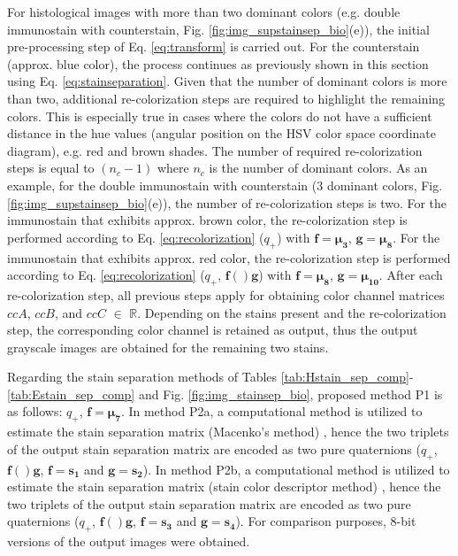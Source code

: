 \documentclass[superscriptaddress,longbibliography,aps,prl,twocolumn,10pt]{revtex4-2}
\begin{document}
For histological images with more than two dominant colors (e.g. double immunostain with counterstain, Fig. \ref{fig:img_supstainsep_bio}(e)), the initial pre-processing step of Eq. \ref{eq:transform} is carried out. For the counterstain (approx. blue color), the process continues as previously shown in this section using Eq. \ref{eq:stainseparation}. Given that the number of dominant colors is more than two, additional re-colorization steps are required to highlight the remaining colors. This is especially true in cases where the colors do not have a sufficient distance in the hue values (angular position on the HSV color space coordinate diagram), e.g. red and brown shades. The number of required re-colorization steps is equal to $(n_{c}-1)$ where $n_{c}$ is the number of dominant colors. As an example, for the double immunostain with counterstain (3 dominant colors, Fig. \ref{fig:img_supstainsep_bio}(e)), the number of re-colorization steps is two. For the immunostain that exhibits approx. brown color, the re-colorization step is performed according to Eq. \ref{eq:recolorization} ($q_+$) with $\boldsymbol{f} = \boldsymbol{\mu_{3}}$, $\boldsymbol{g} = \boldsymbol{\mu_{8}}$. For the immunostain that exhibits approx. red color, the re-colorization step is performed according to Eq. \ref{eq:recolorization} ($q_+$, $\boldsymbol{f}()\boldsymbol{g}$) with $\boldsymbol{f} = \boldsymbol{\mu_{8}}$, $\boldsymbol{g} = \boldsymbol{\mu_{10}}$. After each re-colorization step, all previous steps apply for obtaining color channel matrices $ccA$, $ccB$, and $ccC$ $\in$ $\mathbb{R}$. Depending on the stains present and the re-colorization step, the corresponding color channel is retained as output, thus the output grayscale images are obtained for the remaining two stains.

Regarding the stain separation methods of Tables \ref{tab:Hstain_sep_comp}-\ref{tab:Estain_sep_comp} and Fig. \ref{fig:img_stainsep_bio}, proposed method P1 is as follows: $q_+$, $\boldsymbol{f} = \boldsymbol{\mu_{7}}$. In method P2a, a computational method is utilized to estimate the stain separation matrix (Macenko's method) \cite{Macenko2009, stain_normalisation_toolbox_v2_2}, hence the two triplets of the output stain separation matrix are encoded as two pure quaternions ($q_+$, $\boldsymbol{f}()\boldsymbol{g}$, $\boldsymbol{f}=\boldsymbol{s_{1}}$ and $\boldsymbol{g}=\boldsymbol{s_{2}}$). In method P2b, a computational method is utilized to estimate the stain separation matrix (stain color descriptor method) \cite{Khan2014, stain_normalisation_toolbox_v2_2}, hence the two triplets of the output stain separation matrix are encoded as two pure quaternions ($q_+$, $\boldsymbol{f}()\boldsymbol{g}$, $\boldsymbol{f}=\boldsymbol{s_{3}}$ and $\boldsymbol{g}=\boldsymbol{s_{4}}$). For comparison purposes, 8-bit versions of the output images were obtained.
\end{document}
